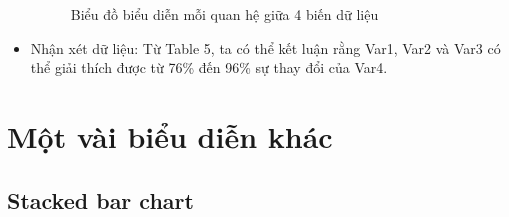 \documentclass[a4paper, 12pt]{article}
\begin{document}
\begin{itemize}
\begin{figure}[H]
\begin{center}
                \caption{Biểu đồ biểu diễn mỗi quan hệ giữa 4 biến dữ liệu}
            \end{center}
        \end{figure}

        \item Nhận xét dữ liệu: Từ Table 5, ta có thể kết luận rằng Var1, Var2 và Var3 có thể giải thích được từ 76\% đến 96\% sự thay đổi của Var4.
    \end{itemize}
    \clearpage

    \section{Một vài biểu diễn khác}

    \subsection{Stacked bar chart}
\end{document}
